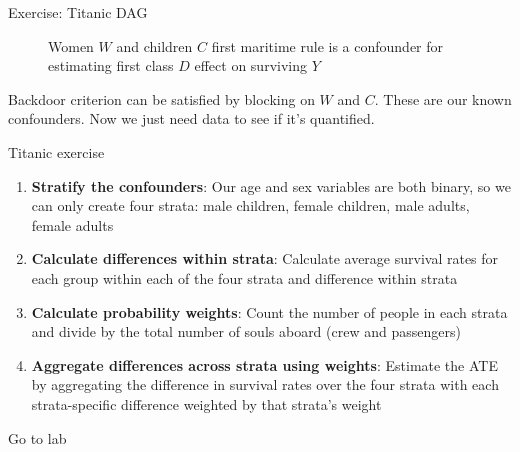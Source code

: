 \documentclass{beamer}
\begin{document}
\begin{frame}{Exercise: Titanic DAG}

\begin{figure}
\begin{center}
\caption{Women $W$ and children $C$ first maritime rule is a confounder for estimating first class $D$ effect on surviving $Y$}
\label{fig:titanic}
\end{center}
\end{figure}

\bigskip

Backdoor criterion can be satisfied by blocking on $W$ and $C$.  These are our known confounders.  Now we just need data to see if it's quantified.

\end{frame}

\begin{frame}{Titanic exercise}

\begin{enumerate}
\item \textbf{Stratify the confounders}: Our age and sex variables are both binary, so we can only create four strata: male children, female children, male adults, female adults
\item \textbf{Calculate differences within strata}: Calculate average survival rates for each group within each of the four strata and difference within strata
\item \textbf{Calculate probability weights}: Count the number of people in each strata and divide by the total number of souls aboard (crew and passengers)
\item \textbf{Aggregate differences across strata using weights}: Estimate the ATE by aggregating the difference in survival rates over the four strata with each strata-specific difference weighted by that strata's weight
\end{enumerate}

\bigskip

Go to lab

\end{frame}
\end{document}
